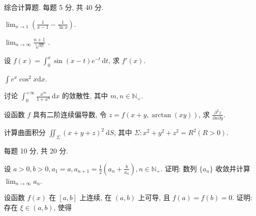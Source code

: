 \par{}
综合计算题. 每题 5 分, 共 40 分.\par
$\lim_{x\to 1}\left(\frac{1}{x - 1} -\frac{1}{\ln x}\right).$\par
\par
$\lim_{n\to\infty}\frac{n+1}{\sqrt[n]{n!}}$ .\par
设 $f(x) = \int_{0}^{x} \sin (x - t)e^{-t} \, \mathrm{d}t$, 求 $f'(x)$.\par
$\int e^{x}\cos^{2}x\mathrm{d}x.$\par
讨论 $\int_0^{+\infty} \frac{x^m}{1 + x^n} \, \mathrm{d}x$ 的敛散性, 其中 $m, n \in \mathbb{N}_+$.\par
设函数 $f$ 具有二阶连续偏导数, 令 $z = f(x + y, \arctan(xy))$, 求 $\frac{\partial^2 z}{\partial x \partial y}$.\par
计算曲面积分 $\iint_{\Sigma} (x + y + z)^2 \mathrm{~d} S$, 其中 $\Sigma: x^2 + y^2 + z^2 = R^2 (R > 0)$.\par
\par{}
每题 10 分, 共 20 分.\par
设 $a > 0, b > 0, a_1 = a, a_{n+1} = \frac{1}{2}\left(a_n + \frac{b}{a_n}\right), n \in \mathbb{N}_+$. 证明: 数列 $\{a_n\}$ 收敛并计算 $\lim_{n \to \infty} a_n$.\par
设函数 $f(x)$ 在 $[a, b]$ 上连续, 在 $(a, b)$ 上可导, 且 $f(a) = f(b) = 0$. 证明: 存在 $\xi \in (a, b)$, 使得\par
